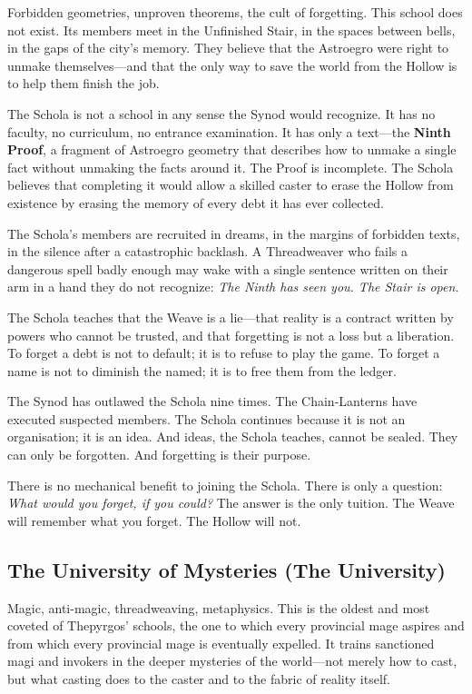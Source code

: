 \documentclass[10pt,twocolumn]{book}
\begin{document}
Forbidden geometries, unproven theorems, the cult of forgetting. This school does not exist. Its members meet in the Unfinished Stair, in the spaces between bells, in the gaps of the city's memory. They believe that the Astroegro were right to unmake themselves---and that the only way to save the world from the Hollow is to help them finish the job.

The Schola is not a school in any sense the Synod would recognize. It has no faculty, no curriculum, no entrance examination. It has only a text---the \textbf{Ninth Proof}, a fragment of Astroegro geometry that describes how to unmake a single fact without unmaking the facts around it. The Proof is incomplete. The Schola believes that completing it would allow a skilled caster to erase the Hollow from existence by erasing the memory of every debt it has ever collected.

The Schola's members are recruited in dreams, in the margins of forbidden texts, in the silence after a catastrophic backlash. A Threadweaver who fails a dangerous spell badly enough may wake with a single sentence written on their arm in a hand they do not recognize: \textit{The Ninth has seen you. The Stair is open.}

The Schola teaches that the Weave is a lie---that reality is a contract written by powers who cannot be trusted, and that forgetting is not a loss but a liberation. To forget a debt is not to default; it is to refuse to play the game. To forget a name is not to diminish the named; it is to free them from the ledger.

The Synod has outlawed the Schola nine times. The Chain-Lanterns have executed suspected members. The Schola continues because it is not an organisation; it is an idea. And ideas, the Schola teaches, cannot be sealed. They can only be forgotten. And forgetting is their purpose.

There is no mechanical benefit to joining the Schola. There is only a question: \textit{What would you forget, if you could?} The answer is the only tuition. The Weave will remember what you forget. The Hollow will not.

\subsection{The University of Mysteries (The University)}

Magic, anti-magic, threadweaving, metaphysics. This is the oldest and most coveted of Thepyrgos' schools, the one to which every provincial mage aspires and from which every provincial mage is eventually expelled. It trains sanctioned magi and invokers in the deeper mysteries of the world---not merely how to cast, but what casting does to the caster and to the fabric of reality itself.
\end{document}

